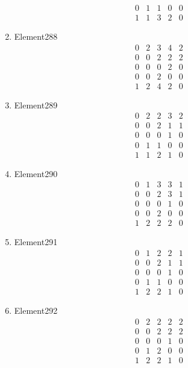 \documentclass[12pt]{article}
\begin{document}
\begin{multicols}{3}
\begin{enumerate}
\begin{equation*}
\begin{array}{ccccc}
0&1&1&0&0\\
1&1&3&2&0
\end{array}
\end{equation*}
\item Element288
\begin{equation*}
\begin{array}{ccccc}
0&2&3&4&2\\
0&0&2&2&2\\
0&0&0&2&0\\
0&0&2&0&0\\
1&2&4&2&0
\end{array}
\end{equation*}
\item Element289
\begin{equation*}
\begin{array}{ccccc}
0&2&2&3&2\\
0&0&2&1&1\\
0&0&0&1&0\\
0&1&1&0&0\\
1&1&2&1&0
\end{array}
\end{equation*}
\item Element290
\begin{equation*}
\begin{array}{ccccc}
0&1&3&3&1\\
0&0&2&3&1\\
0&0&0&1&0\\
0&0&2&0&0\\
1&2&2&2&0
\end{array}
\end{equation*}
\item Element291
\begin{equation*}
\begin{array}{ccccc}
0&1&2&2&1\\
0&0&2&1&1\\
0&0&0&1&0\\
0&1&1&0&0\\
1&2&2&1&0
\end{array}
\end{equation*}
\item Element292
\begin{equation*}
\begin{array}{ccccc}
0&2&2&2&2\\
0&0&2&2&2\\
0&0&0&1&0\\
0&1&2&0&0\\
1&2&2&1&0
\end{array}

\end{equation*}
\end{enumerate}
\end{multicols}
\end{document}
